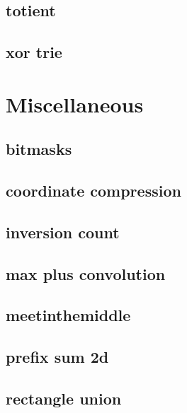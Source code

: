 \subsection{totient}
\raggedbottom
\hrulefill
\subsection{xor trie}
\raggedbottom
\hrulefill

\section{Miscellaneous}
\subsection{bitmasks}
\raggedbottom
\hrulefill
\subsection{coordinate compression}
\raggedbottom
\hrulefill
\subsection{inversion count}
\raggedbottom
\hrulefill
\subsection{max plus convolution}
\raggedbottom
\hrulefill
\subsection{meetinthemiddle}
\raggedbottom
\hrulefill
\subsection{prefix sum 2d}
\raggedbottom
\hrulefill
\subsection{rectangle union}
\raggedbottom
\hrulefill
